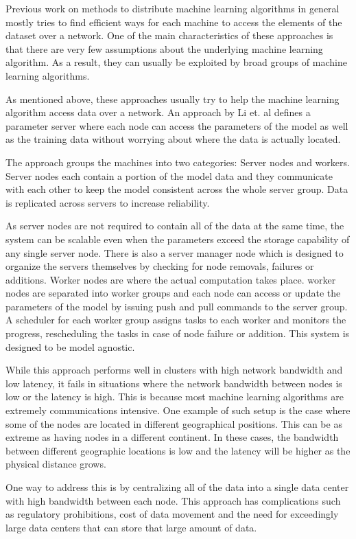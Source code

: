 \documentclass[11pt]{article}       %
\begin{document}
Previous work on methods to distribute machine learning algorithms in general mostly tries to find efficient ways for each machine to access the elements of the dataset over a network. One of the main characteristics of these approaches is that there are very few assumptions about the underlying machine learning algorithm. As a result, they can usually be exploited by broad groups of machine learning algorithms.

As mentioned above, these approaches usually try to help the machine learning algorithm access data over a network. An approach by Li et. al\cite{Li2014} defines a parameter server where each node can access the parameters of the model as well as the training data without worrying about where the data is actually located. 

The approach groups the machines into two categories: Server nodes and workers. Server nodes each contain a portion of the model data and they communicate with each other to keep the model consistent across the whole server group. Data is replicated across servers to increase reliability. 

As server nodes are not required to contain all of the data at the same time, the system can be scalable even when the parameters exceed the storage capability of any single server node. There is also a server manager node which is designed to organize the servers themselves by checking for node removals, failures or additions.
Worker nodes are where the actual computation takes place. worker nodes are separated into worker groups and each node can access or update the parameters of the model by issuing push and pull commands to the server group. A scheduler for each worker group assigns tasks to each worker and monitors the progress, rescheduling the tasks in case of node failure or addition. This system is designed to be model agnostic.

While this approach performs well in clusters with high network bandwidth and low latency, it fails in situations where the network bandwidth between nodes is low or the latency is high. This is because most machine learning algorithms are extremely communications intensive. One example of such setup is the case where some of the nodes are located in different geographical positions. This can be as extreme as having nodes in a different continent. In these cases, the bandwidth between different geographic locations is low and the latency will be higher as the physical distance grows. 

One way to address this is by centralizing all of the data into a single data center with high bandwidth between each node. This approach has complications such as regulatory prohibitions, cost of data movement and the need for exceedingly large data centers that can store that large amount of data. 
\end{document}
